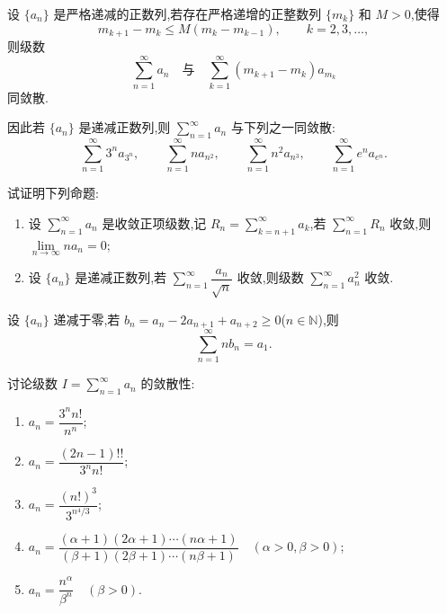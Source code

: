 \documentclass[../../数学分析培优讲义.tex]{subfiles}
\begin{document}
\begin{example}
设 $\{a_n\}$ 是严格递减的正数列,若存在严格递增的正整数列 $\{m_k\}$ 和 $M>0$,使得
\[
    m_{k+1}-m_k\leq M(m_k-m_{k-1}),
    \qquad k=2,3,\ldots,
\]
则级数
\[
    \sum\limits_{n=1}^{\infty}a_n
    \quad\text{与}\quad
    \sum\limits_{k=1}^{\infty}(m_{k+1}-m_k)a_{m_k}
\]
同敛散.
\end{example}
\exampleblank

\begin{remark}
因此若 $\{a_n\}$ 是递减正数列,则 $\displaystyle\sum\limits_{n=1}^{\infty}a_n$ 与下列之一同敛散:
\[
    \sum\limits_{n=1}^{\infty}3^na_{3^n},
    \qquad
    \sum\limits_{n=1}^{\infty}na_{n^2},
    \qquad
    \sum\limits_{n=1}^{\infty}n^2a_{n^3},
    \qquad
    \sum\limits_{n=1}^{\infty}e^na_{e^n}.
\]
\end{remark}

\begin{example}
试证明下列命题:
\begin{enumerate}[label=(\arabic*)]
    \item 设 $\displaystyle\sum\limits_{n=1}^{\infty}a_n$ 是收敛正项级数,记 $\displaystyle R_n=\sum\limits_{k=n+1}^{\infty}a_k$,若 $\displaystyle\sum\limits_{n=1}^{\infty}R_n$ 收敛,则 $\displaystyle\lim\limits_{n\to\infty}na_n=0$;
    \item 设 $\{a_n\}$ 是递减正数列,若 $\displaystyle\sum\limits_{n=1}^{\infty}\dfrac{a_n}{\sqrt n}$ 收敛,则级数 $\displaystyle\sum\limits_{n=1}^{\infty}a_n^2$ 收敛.
\end{enumerate}
\end{example}
\exampleblank

\begin{example}
设 $\{a_n\}$ 递减于零,若 $b_n=a_n-2a_{n+1}+a_{n+2}\geq0$($n\in\mathbb{N}$),则
\[
    \sum\limits_{n=1}^{\infty}nb_n=a_1.
\]
\end{example}
\exampleblank




\begin{example}
讨论级数 $\displaystyle I=\sum\limits_{n=1}^{\infty}a_n$ 的敛散性:
\begin{enumerate}[label=(\arabic*)]
    \item $\displaystyle a_n=\dfrac{3^n n!}{n^n}$;
    \item $\displaystyle a_n=\dfrac{(2n-1)!!}{3^n n!}$;
    \item $\displaystyle a_n=\dfrac{(n!)^3}{3^{n^4/3}}$;
    \item $\displaystyle a_n=\dfrac{(\alpha+1)(2\alpha+1)\cdots(n\alpha+1)}{(\beta+1)(2\beta+1)\cdots(n\beta+1)}\quad(\alpha>0,\beta>0)$;
    \item $\displaystyle a_n=\dfrac{n^\alpha}{\beta^n}\quad(\beta>0)$.
\end{enumerate}
\end{example}
\exampleblank
\end{document}
